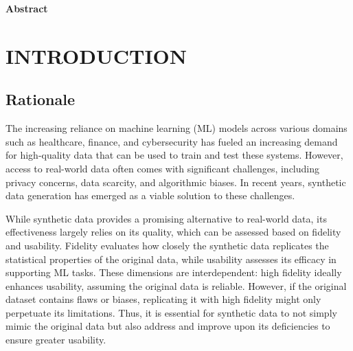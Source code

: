 \documentclass{article}
\begin{document}
\vspace{1em} %

\newpage

\begin{center}
\Large\textbf{Abstract}
\end{center}

\vspace{1em} %

\newpage
\tableofcontents
\thispagestyle{empty} %
\newpage

\setcounter{page}{1}
\section{INTRODUCTION}

\subsection{Rationale}
The increasing reliance on machine learning (ML) models across various domains such as healthcare, finance, and cybersecurity has fueled an increasing demand for high-quality data that can be used to train and test these systems. However, access to real-world data often comes with significant challenges, including privacy concerns, data scarcity, and algorithmic biases. In recent years, synthetic data generation has emerged as a viable solution to these challenges.

While synthetic data provides a promising alternative to real-world data, its effectiveness largely relies on its quality, which can be assessed based on fidelity and usability. Fidelity evaluates how closely the synthetic data replicates the statistical properties of the original data, while usability assesses its efficacy in supporting ML tasks. These dimensions are interdependent: high fidelity ideally enhances usability, assuming the original data is reliable. However, if the original dataset contains flaws or biases, replicating it with high fidelity might only perpetuate its limitations. Thus, it is essential for synthetic data to not simply mimic the original data but also address and improve upon its deficiencies to ensure greater usability.
\end{document}
